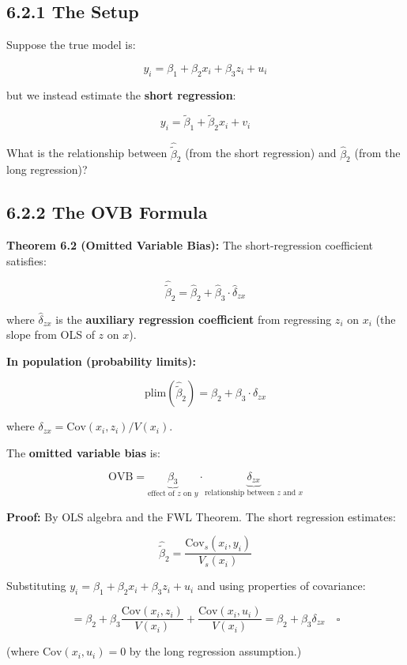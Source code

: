 \subsection{6.2.1 The Setup}

Suppose the true model is:

\[
y_i = \beta_1 + \beta_2 x_i + \beta_3 z_i + u_i \tag{Long}
\]

but we instead estimate the \textbf{short regression}:

\[
y_i = \tilde{\beta}_1 + \tilde{\beta}_2 x_i + v_i \tag{Short}
\]

What is the relationship between $\hat{\tilde{\beta}}_2$ (from the short regression) and $\hat{\beta}_2$ (from the long regression)?

\subsection{6.2.2 The OVB Formula}

\textbf{Theorem 6.2 (Omitted Variable Bias):} The short-regression coefficient satisfies:

\[
\hat{\tilde{\beta}}_2 = \hat{\beta}_2 + \hat{\beta}_3 \cdot \hat{\delta}_{zx}
\]

where $\hat{\delta}_{zx}$ is the \textbf{auxiliary regression coefficient} from regressing $z_i$ on $x_i$ (the slope from OLS of $z$ on $x$).

\textbf{In population (probability limits):}

\[
\text{plim}(\hat{\tilde{\beta}}_2) = \beta_2 + \beta_3 \cdot \delta_{zx}
\]

where $\delta_{zx} = \text{Cov}(x_i, z_i)/V(x_i)$.

The \textbf{omitted variable bias} is:

\[
\text{OVB} = \underbrace{\beta_3}_{\text{effect of } z \text{ on } y} \cdot \underbrace{\delta_{zx}}_{\text{relationship between } z \text{ and } x}
\]

\textbf{Proof:} By OLS algebra and the FWL Theorem. The short regression estimates:

\[
\hat{\tilde{\beta}}_2 = \frac{\text{Cov}_s(x_i, y_i)}{V_s(x_i)}
\]

Substituting $y_i = \beta_1 + \beta_2 x_i + \beta_3 z_i + u_i$ and using properties of covariance:

\[
= \beta_2 + \beta_3 \frac{\text{Cov}(x_i, z_i)}{V(x_i)} + \frac{\text{Cov}(x_i, u_i)}{V(x_i)} = \beta_2 + \beta_3 \delta_{zx} \quad \square
\]

(where $\text{Cov}(x_i, u_i) = 0$ by the long regression assumption.)

